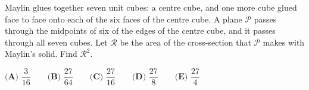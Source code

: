 Maylin glues together seven unit cubes: a centre cube, and one more cube glued face to face onto each of the six faces of the centre cube. A plane $\mathcal{P}$ passes through the midpoints of six of the edges of the centre cube, and it passes through all seven cubes. Let $\mathcal{R}$ be the area of the cross-section that $\mathcal{P}$ makes with Maylin's solid. Find $\mathcal{R}^2$.

$\textbf{(A) }\dfrac{3}{16}\qquad\textbf{(B) }\dfrac{27}{64}\qquad\textbf{(C) }\dfrac{27}{16}\qquad\textbf{(D) }\dfrac{27}{8}\qquad\textbf{(E) }\dfrac{27}{4}$
